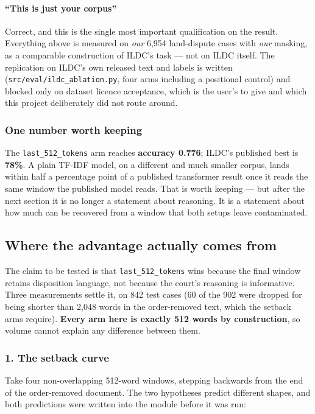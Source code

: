 \documentclass[12pt,a4paper]{article}
\newcommand{\code}[1]{\texttt{\small #1}}
\begin{document}
\paragraph{``This is just your corpus''} Correct, and this is the single most important
qualification on the result. Everything above is measured on \emph{our} 6,954 land-dispute cases
with \emph{our} masking, as a comparable construction of ILDC's task --- not on ILDC itself. The
replication on ILDC's own released text and labels is written
(\code{src/eval/ildc\_ablation.py}, four arms including a positional control) and blocked only on
dataset licence acceptance, which is the user's to give and which this project deliberately did not
route around.

\subsubsection*{One number worth keeping}

The \code{last\_512\_tokens} arm reaches \textbf{accuracy 0.776}; ILDC's published best is
\textbf{78\%}. A plain TF-IDF model, on a different and much smaller corpus, lands within half a
percentage point of a published transformer result once it reads the same window the published model
reads. That is worth keeping --- but after the next section it is no longer a statement about
reasoning. It is a statement about how much can be recovered from a window that both setups leave
contaminated.

\subsection{Where the advantage actually comes from}\label{sec:contamination}

The claim to be tested is that \code{last\_512\_tokens} wins because the final window retains
disposition language, not because the court's reasoning is informative. Three measurements settle
it, on 842 test cases (60 of the 902 were dropped for being shorter than 2,048 words in the
order-removed text, which the setback arms require). \textbf{Every arm here is exactly 512 words by
construction}, so volume cannot explain any difference between them.

\subsubsection*{1. The setback curve}

Take four non-overlapping 512-word windows, stepping backwards from the end of the order-removed
document. The two hypotheses predict different shapes, and both predictions were written into the
module before it was run:
\end{document}
